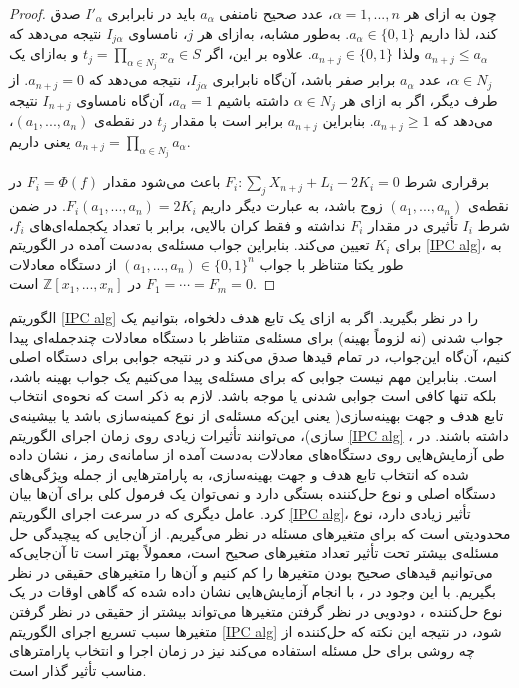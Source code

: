 \begin{proof}
چون به ازای هر 
$\alpha = 1,...,n$، 
 عدد صحیح نامنفی 
$a_{\alpha}$
باید در نابرابری 
$I'_{\alpha}$
صدق کند، لذا داریم 
$a_{\alpha}\in \{0, 1\}$.
به‌طور مشابه،  به‌ازای هر 
$j$، 
نامساوی 
$I_{j\alpha}$
نتیجه می‌دهد که 
$a_{n + j}\leq a_{\alpha}$
ولذا 
$a_{n+j}\in \{0, 1\}$. 
علاوه‌ بر این، اگر 
$t_{j} = \prod_{\alpha\in N_{j}}x_{\alpha}\in S$
و به‌ازای یک 
$\alpha\in N_{j}$، 
 عدد 
$a_{\alpha}$
برابر صفر باشد، آن‌گاه نابرابری 
$I_{j\alpha}$، 
 نتیجه می‌دهد که 
$a_{n+j} = 0$.
 از طرف دیگر، اگر به ازای هر 
 $\alpha\in N_{j}$
 داشته باشیم
 $a_{\alpha} = 1$، 
 آن‌گاه نامساوی 
 $I_{n + j}$
 نتیجه می‌دهد که 
 $a_{n+j}\geq 1$.
بنابراین
 $a_{n+j}$
 برابر است با مقدار 
 $t_{j}$
 در نقطه‌ی 
 $(a_{1},...,a_{n})$،
 یعنی داریم 
 $a_{n+j} = \prod_{\alpha\in N_{j}}a_{\alpha}$.
 
 
 برقراری شرط 
$F_{i}: \sum_{j}X_{n + j} + L_{i} - 2K_{i} = 0$
 باعث می‌شود مقدار 
 $F_{i} = \Phi(f)$
 در نقطه‌ی 
 $(a_{1},...,a_{n})$
 زوج باشد، به عبارت دیگر داریم 
 $F_{i}(a_{1},...,a_{n}) = 2K_{i}$. 
 در ضمن شرط 
 $I_{i}$
 تأثیری در مقدار 
 $F_{i}$
 نداشته و فقط کران بالایی، برابر با تعداد یکجمله‌ای‌های 
 $f_{i}$، 
 برای 
 $K_{i}$
 تعیین می‌کند. بنابراین جواب مسئله‌ی 
به‌دست  آمده در الگوریتم
\ref{IPC alg}، 
 به طور یکتا متناظر با جواب 
$(a_{1},...,a_{n})\in \{0, 1\}^{n}$
از دستگاه معادلات 
$F_{1} = \cdots = F_{m} = 0$
در 
$\mathbb{Z}[x_{1},...,x_{n}]$
است.
\end{proof}

\begin{remark}
الگوریتم 
\ref{IPC alg}
را در نظر بگیرید. اگر به ازای یک تابع هدف دلخواه، بتوانیم یک جواب شدنی (نه لزوماً بهینه) برای مسئله‌ی 
متناظر با دستگاه معادلات چندجمله‌ای پیدا کنیم، آن‌گاه این‌جواب،  در تمام قید‌ها صدق می‌کند و در نتیجه جوابی برای دستگاه اصلی است. بنابراین مهم نیست جوابی که برای مسئله‌ی 
پیدا می‌کنیم یک جواب بهینه باشد، بلکه تنها کافی است جوابی شدنی یا موجه باشد. لازم به ذکر است که نحوه‌ی انتخاب تابع هدف و جهت بهینه‌سازی( یعنی این‌که مسئله‌ی 
از نوع کمینه‌سازی باشد یا بیشینه‌ی سازی)، می‌توانند تأثیرات زیادی روی زمان اجرای الگوریتم 
\ref{IPC alg}
داشته باشند. در 
\cite{ullah2012new}،
طی آزمایش‌هایی روی دستگاه‌های معادلات به‌دست آمده از سامانه‌ی رمز 
،
نشان داده شده که انتخاب تابع هدف و جهت بهینه‌سازی،  به پارامتر‌هایی از جمله ویژگی‌های دستگاه اصلی و نوع حل‌کننده بستگی دارد و نمی‌توان یک فرمول کلی برای آن‌ها بیان کرد.  عامل دیگری که در سرعت اجرای الگوریتم 
\ref{IPC alg}، 
 تأثیر زیادی دارد، نوع محدودیتی است که برای متغیرهای مسئله 
در نظر می‌گیریم. از آن‌جایی که پیچیدگی حل مسئله‌ی 
بیشتر تحت تأثیر تعداد متغیرهای صحیح است، معمولاً بهتر است تا آن‌جایی‌که می‌توانیم قید‌های صحیح بودن متغیرها را کم کنیم و آن‌ها را متغیرهای حقیقی در نظر بگیریم. با این وجود در 
\cite{ullah2012new}،
با انجام آزمایش‌هایی نشان داده شده که گاهی اوقات در یک نوع حل‌کننده‌ 
، 
 دودویی در نظر گرفتن متغیرها می‌تواند بیشتر از حقیقی در نظر گرفتن متغیرها سبب تسریع اجرای الگوریتم 
\ref{IPC alg}
 شود، در نتیجه این نکته که حل‌کننده از چه روشی برای حل مسئله‌ 
 استفاده می‌کند نیز در زمان اجرا و انتخاب پارامترهای مناسب تأثیر گذار است. 
\end{remark}

